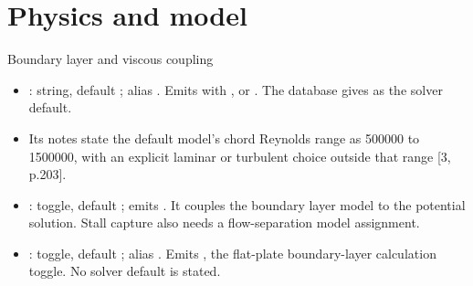 %
\section{Physics and model}

\begin{frame}{Boundary layer and viscous coupling}
\begin{itemize}\small
  \item {}: string, default ; alias
        . Emits 
        with ,  or .
        The database gives  as the solver default.
  \item Its notes state the default model's chord Reynolds range as
        500000 to 1500000, with an explicit laminar or turbulent choice
        outside that range [3, p.203].
  \item {}: toggle, default ; emits
        . It couples the boundary
        layer model to the potential solution. Stall capture also needs
        a flow-separation model assignment.
  \item {}: toggle, default ; alias
        . Emits
        , the flat-plate
        boundary-layer calculation toggle. No solver default is stated.
\end{itemize}
\end{frame}


